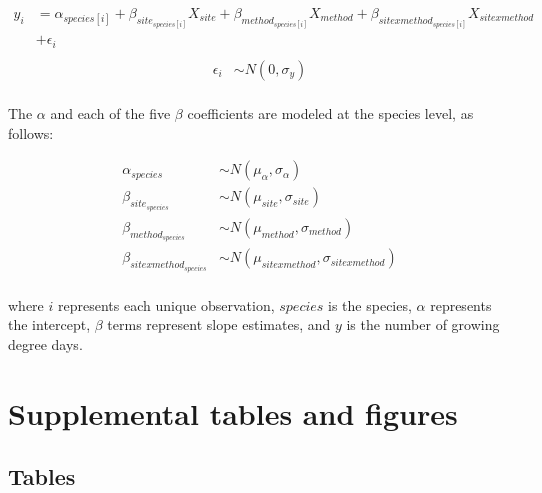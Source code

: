 \documentclass{article}\usepackage[]{graphicx}\usepackage[]{color}
\begin{document}
\begin{align*}
y_i &= \alpha_{species[i]} + \beta_{site_{species[i]}}X_{site} + \beta_{method_{species[i]}}X_{method} + \beta_{sitexmethod_{species[i]}}X_{sitexmethod}\\
&+ \epsilon_i \tag{1}\\
\end{align*}
\begin{align*}
\epsilon_i & \sim N(0,\sigma_y) \\
\end{align*}

The $\alpha$ and each of the five $\beta$ coefficients are modeled at the species level, as follows:

\begin{align*}
\alpha_{species} & \sim N(\mu_{\alpha}, \sigma_{\alpha}) \\
\beta_{site_{species}} & \sim N(\mu_{site}, \sigma_{site}) \\
\beta_{method_{species}} & \sim N(\mu_{method}, \sigma_{method}) \\
\beta_{sitexmethod_{species}} & \sim N(\mu_{sitexmethod}, \sigma_{sitexmethod}) \\
\end{align*}

where $i$ represents each unique observation, $species$ is the species, $\alpha$ represents the intercept, $\beta$ terms represent slope estimates, and $y$ is the number of growing degree days. 




\section*{Supplemental tables and figures}
\subsection*{Tables}
\end{document}
